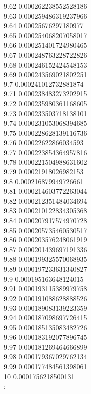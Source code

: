 {9.62	0.000262238552528186\\
9.63	0.000259486319237966\\
9.64	0.00025676297180977\\
9.65	0.000254068207058017\\
9.66	0.000251401724980465\\
9.67	0.000248763228722826\\
9.68	0.000246152424548153\\
9.69	0.000243569021802251\\
9.7	0.000241012732881874\\
9.71	0.000238483273202915\\
9.72	0.000235980361168605\\
9.73	0.000233503718138101\\
9.74	0.000231053068394685\\
9.75	0.000228628139116736\\
9.76	0.00022622866034593\\
9.77	0.000223854364957816\\
9.78	0.000221504988631602\\
9.79	0.00021918026982153\\
9.8	0.000216879949726661\\
9.81	0.000214603772263044\\
9.82	0.000212351484034694\\
9.83	0.000210122834305368\\
9.84	0.000207917574970728\\
9.85	0.000205735460530517\\
9.86	0.000203576248061919\\
9.87	0.000201439697191336\\
9.88	0.000199325570068935\\
9.89	0.000197233631340827\\
9.9	0.000195163648124015\\
9.91	0.000193115389979758\\
9.92	0.000191088628888526\\
9.93	0.000189083139223359\\
9.94	0.000187098697726415\\
9.95	0.000185135083482726\\
9.96	0.000183192077896745\\
9.97	0.000181269464666899\\
9.98	0.000179367029762134\\
9.99	0.000177484561398061\\
10	0.0001756218500131\\
};
